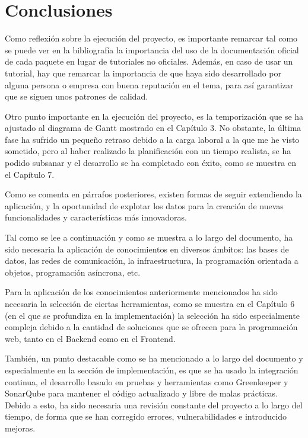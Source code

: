\chapter{Conclusiones}

Como reflexión sobre la ejecución del proyecto, es importante remarcar tal como se puede ver en la bibliografía la importancia del uso de la documentación oficial de cada paquete en lugar de tutoriales no oficiales. Además, en caso de usar un tutorial, hay que remarcar la importancia de que haya sido desarrollado por alguna persona o empresa con buena reputación en el tema, para así garantizar que se siguen unos patrones de calidad.


Otro punto importante en la ejecución del proyecto, es la temporización que se ha ajustado al diagrama de Gantt mostrado en el Capítulo 3. No obstante, la última fase ha sufrido un pequeño retraso debido a la carga laboral a la que me he visto sometido, pero al haber realizado la planificación con un tiempo realista, se ha podido subsanar y el desarrollo se ha completado con éxito, como se muestra en el Capítulo 7.

Como se comenta en párrafos posteriores, existen formas de seguir extendiendo la aplicación, y la oportunidad de explotar los datos para la creación de nuevas funcionalidades y características más innovadoras.

Tal como se lee a continuación y como se muestra a lo largo del documento, ha sido necesaria la aplicación de conocimientos en diversos ámbitos: las bases de datos, las redes de comunicación, la infraestructura, la programación orientada a objetos, programación asíncrona, etc.

Para la aplicación de los conocimientos anteriormente mencionados ha sido necesaria la selección de ciertas herramientas, como se muestra en el Capítulo 6 (en el que se profundiza en la implementación) la selección ha sido especialmente compleja debido a la cantidad de soluciones que se ofrecen para la programación web, tanto en el Backend como en el Frontend.

También, un punto destacable como se ha mencionado a lo largo del documento y especialmente en la sección de implementación, es que se ha usado la integración continua, el desarrollo basado en pruebas y herramientas como Greenkeeper y SonarQube para mantener el código actualizado y libre de malas prácticas. Debido a esto, ha sido necesaria una revisión constante del proyecto a lo largo del tiempo, de forma que se han corregido errores, vulnerabilidades e introducido mejoras.


